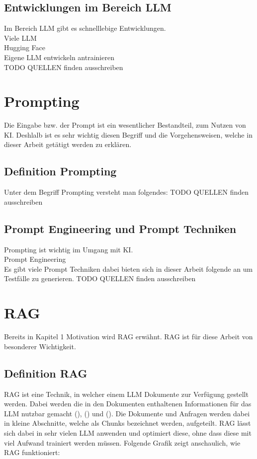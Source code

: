 \documentclass[12pt,toc=bib,toc=listof]{scrreprt}
\begin{document}
\subsection{Entwicklungen im Bereich LLM} %
\label{sec:entwicklungenImBereichLLM}
Im Bereich LLM gibt es schnelllebige Entwicklungen.\\
Viele LLM\\
Hugging Face\\
Eigene LLM entwickeln antrainieren\\
TODO QUELLEN finden ausschreiben

\section{Prompting} %
\label{sec:prompting}
Die Eingabe bzw. der Prompt ist ein wesentlicher Bestandteil, zum Nutzen von KI. Deshlalb ist es sehr wichtig diesen Begriff und die Vorgehensweisen, welche in dieser Arbeit getätigt werden zu erklären.

\subsection{Definition Prompting} %
\label{sec:definitionPrompting}
Unter dem Begriff Prompting versteht man folgendes:
TODO QUELLEN finden ausschreiben

\subsection{Prompt Engineering und Prompt Techniken} %
\label{sec:promptEngineeringUndPromptTechniken}
Prompting ist wichtig im Umgang mit KI.\\
Prompt Engineering\\
Es gibt viele Prompt Techniken dabei bieten sich in dieser Arbeit folgende an um Testfälle zu generieren.
TODO QUELLEN finden ausschreiben

\section{RAG} %
\label{sec:rag}
Bereits in Kapitel 1 Motivation wird RAG erwähnt. RAG ist für diese Arbeit von besonderer Wichtigkeit. 

\subsection{Definition RAG} %
\label{sec:definitionRAG}
RAG ist eine Technik, in welcher einem LLM Dokumente zur Verfügung gestellt werden. Dabei werden die in den Dokumenten enthaltenen Informationen für das LLM nutzbar gemacht (\cite{Honroth2024}), (\cite{Miesle2023}) und (\cite{Schmid2024}). Die Dokumente und Anfragen werden dabei in kleine Abschnitte, welche als Chunks bezeichnet werden, aufgeteilt. RAG lässt sich dabei in sehr vielen LLM anwenden und optimiert diese, ohne dass diese mit viel Aufwand trainiert werden müssen. Folgende Grafik zeigt anschaulich, wie RAG funktioniert:
\end{document}
